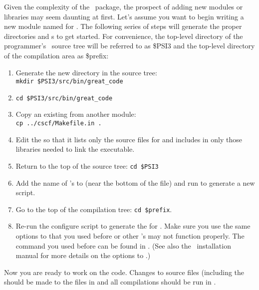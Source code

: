 Given the complexity of the \PSIthree\ package, the prospect of adding
new modules or libraries may seem daunting at first.  Let's assume you
want to begin writing a new module named  for
\PSIthree.  The following series of steps will generate the proper
directories and s to get started.  For convenience, the
top-level directory of the programmer's \PSIthree\ source tree will be
referred to as \$PSI3 and the top-level directory of the compilation
area as \$prefix:
\begin{enumerate}
\item Generate the new directory in the source tree: \\
{\tt mkdir \$PSI3/src/bin/great\_code}

\item {\tt cd \$PSI3/src/bin/great\_code}

\item Copy an existing  from another module: \\
{\tt cp ../cscf/Makefile.in .}

\item Edit the  so that it lists only the source
files for  and includes in  only
those libraries needed to link the executable.

\item Return to the top of the source tree: {\tt cd \$PSI3}

\item Add the name of 's  to
 (near the bottom of the file) and run
 to generate a new  script.

\item Go to the top of the compilation tree: {\tt cd \$prefix}.

\item Re-run the configure script to generate the  for
.  Make sure you use the same options to
 that you used before or other 's may
not function properly.  The command you used before can be found in
.  (See also the \PSIthree\ installation
manual for more details on the options to .)

\end{enumerate}

Now you are ready to work on the code.  Changes to source files
(including the  should be made to the files in
 and all compilations
should be run in .


